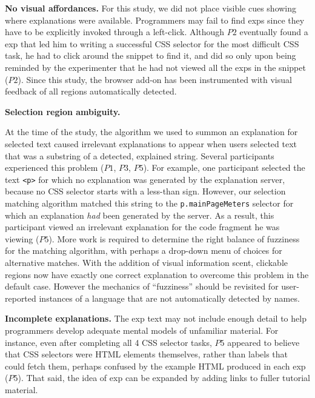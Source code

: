 {\bf No visual affordances.} For this study, we did not place  visible cues showing where explanations were available.
Programmers may fail to find \glspl{exp} since they have to be explicitly invoked through a left-click.
Although $P2$ eventually found a \gls{exp} that led him to writing a successful CSS selector for the most difficult CSS task, he had to click around the snippet to find it, and did so only upon being reminded by the experimenter that he had not viewed all the \glspl{exp} in the snippet ($P2$).
\fi
Since this study, the browser add-on has been instrumented with visual feedback of all regions automatically detected.

{\bf Selection region ambiguity.}
\begin{changes}
At the time of the study, the algorithm we used to summon an explanation for selected text caused irrelevant explanations to appear when users selected text that was a substring of a detected, explained string.
Several participants experienced this problem ($P1$, $P3$, $P5$).
For example, one participant selected the text \texttt{<p>} for which no explanation was generated by the explanation server, because no CSS selector starts with a less-than sign.
However, our selection matching algorithm matched this string to the \texttt{p.mainPageMeters} selector for which an explanation \emph{had} been generated by the server.
As a result, this participant viewed an irrelevant explanation for the code fragment he was viewing ($P5$).
More work is required to determine the right balance of fuzziness for the matching algorithm, with perhaps a drop-down menu of choices for alternative matches.
\fi
With the addition of visual information scent, clickable regions now have exactly one correct explanation to overcome this problem in the default case.
However the mechanics of ``fuzziness'' should be revisited for user-reported instances of a language that are not automatically detected by \Glspl{name}.
\end{changes}

{\bf Incomplete explanations.} The  \gls{exp} text may not include enough detail to help programmers  develop adequate mental models of unfamiliar material. For instance,
even after completing all 4 CSS selector tasks, $P5$ appeared to believe that CSS selectors were HTML elements themselves, rather than labels that could fetch them, perhaps confused by the example HTML produced in each \gls{exp} ($P5$).
That said, the idea of \gls{exp} can be expanded by adding links to fuller tutorial material.
